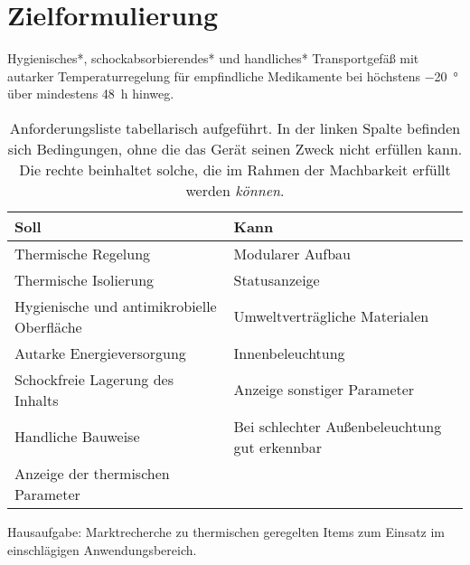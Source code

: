 \chapter*{Zielformulierung}



	Hygienisches*, schockabsorbierendes* und handliches* Transportgefäß mit autarker Temperaturregelung für empfindliche
	Medikamente bei höchstens \SI{-20}{\degree} über mindestens \SI{48}{h} hinweg.
	\newpage
	\begin{table}[h]
		\centering
		\caption{Anforderungsliste tabellarisch aufgeführt. In der linken Spalte befinden sich Bedingungen, ohne die das Gerät seinen Zweck
		nicht erfüllen kann. Die rechte beinhaltet solche, die im Rahmen der Machbarkeit erfüllt werden \textit{können}.}
		\begin{tabular}{@{}ll@{}}
			\toprule
			\textbf{Soll} & \textbf{Kann} \\
			\midrule
			Thermische Regelung 							& Modularer Aufbau \\
			Thermische Isolierung 							& Statusanzeige \\
			Hygienische und antimikrobielle Oberfläche 		& Umweltverträgliche Materialen \\
			Autarke Energieversorgung 						& Innenbeleuchtung \\
			Schockfreie Lagerung des Inhalts 				& Anzeige sonstiger Parameter \\
			Handliche Bauweise 								& Bei schlechter Außenbeleuchtung gut erkennbar \\
			Anzeige der thermischen Parameter & \\
			\bottomrule
		\end{tabular}
	\end{table}

	Hausaufgabe: Marktrecherche zu thermischen geregelten Items zum Einsatz im einschlägigen Anwendungsbereich.